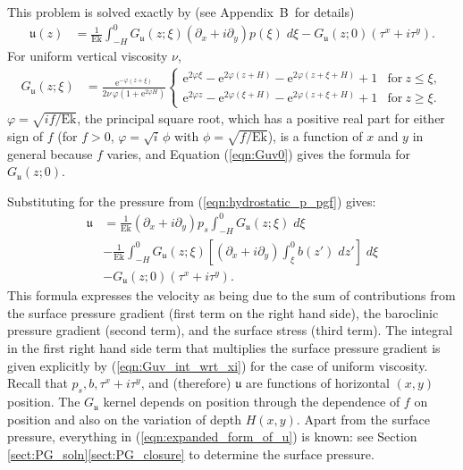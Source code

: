 \documentclass{ametsocV6.2}
\newcommand{\appFGEqnSoln}{Appendix~B}
\begin{document}
This problem is solved exactly by (see \appFGEqnSoln\ for details)
\begin{align}
\mathfrak{u} (z) & = \frac{1}{\mathrm{Ek}} \int_{-H}^{0} G_{ \mathfrak{u}} (z; \xi) \left( \partial_x + i \partial_y \right) p(\xi) \; d \xi 
 -   G_{\mathfrak{u}} (z; 0)  \left( \tau^x + i \tau^y \right) .
 \label{eqn:final_uv}
\end{align}
For uniform vertical viscosity $\nu$,
\begin{align}
 G_{ \mathfrak{u}}(z;\xi) & = 
\frac{ \mathrm{e}^{- \varphi (z + \xi)} }{2 \nu \, \varphi  \left(1 + \mathrm{e}^{2 \varphi H } \right)}
\begin{cases} 
\displaystyle \mathrm{e}^{2 \varphi \xi} - \mathrm{e}^{2 \varphi \left( z + H\right)} - \mathrm{e}^{2 \varphi \left( z + \xi + H\right)} + 1
 & \text{for}\: z \leq \xi , \\
\displaystyle \mathrm{e}^{2 \varphi z} - \mathrm{e}^{2 \varphi \left( \xi + H\right)} - \mathrm{e}^{2 \varphi \left( z + \xi + H\right)} + 1
 & \text{for}\: z \geq \xi .
\end{cases}  \label{eqn:FG_Gsfn} 
\end{align}
$\varphi = \sqrt{i f/ \mathrm{Ek}}$, the principal square root, which has a positive real part for either sign of $f$ (for $f > 0$, $\varphi = \sqrt{i} \, \phi$ with $\phi = \sqrt{f/\mathrm{Ek}}$), is a function of $x$ and $y$ in general because $f$ varies, and Equation (\ref{eqn:Guv0}) gives the formula for $G_{\mathfrak{u}} (z; 0)$.

Substituting for the pressure from (\ref{eqn:hydrostatic_p_pgf}) gives:
\begin{align}
\mathfrak{u}
& = \frac{1}{\mathrm{Ek}} \left(\partial_x  + i \partial_y \right) p_s \int_{-H}^{0} G_{ \mathfrak{u}} (z; \xi) \; d \xi \nonumber \\
&- \frac{1}{\mathrm{Ek}} \int_{-H}^{0} G_{ \mathfrak{u}} (z; \xi) \left[ \left(\partial_x  + i \partial_y \right)  \int_{\xi}^{0} b(z') \; dz' \right] \; d \xi  \nonumber \\
& - G_{\mathfrak{u}} (z; 0)  \left( \tau^x + i \tau^y \right)  .
\label{eqn:expanded_form_of_u}
\end{align}
This formula expresses the velocity as being due to the sum of contributions from the surface pressure gradient (first term on the right hand side), the baroclinic pressure gradient (second term), and the surface stress (third term).
The integral in the first right hand side term that multiplies the surface pressure gradient is given explicitly by (\ref{eqn:Guv_int_wrt_xi}) for the case of uniform viscosity.
Recall that $p_s, b, \tau^x + i \tau^y$, and (therefore) $\mathfrak{u}$ are functions of horizontal $(x,y)$ position.
The $G_{\mathfrak{u}}$ kernel depends on position through the dependence of $f$ on position and also on the variation of depth $H(x,y)$.
Apart from the surface pressure, everything in (\ref{eqn:expanded_form_of_u}) is known: see Section \ref{sect:PG_soln}\ref{sect:PG_closure} to determine the surface pressure.
\end{document}
